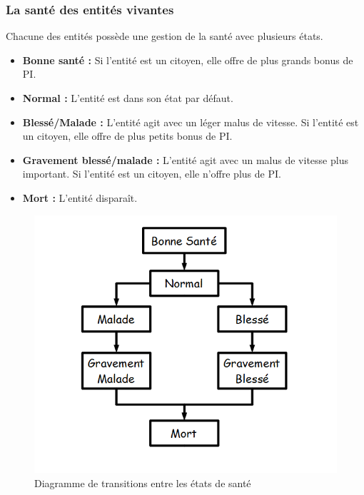 \documentclass[a4paper]{article}
\newcommand{\alinea}{\hspace*{0.5cm}}
\begin{document}
		  \subsubsection{La santé des entités vivantes}
			\alinea Chacune des entités possède une gestion de la santé avec plusieurs états.
			\begin{itemize} \small
			  \item \textbf{Bonne santé :} Si l'entité est un citoyen, elle offre de plus grands bonus de PI.
			  \item \textbf{Normal :} L'entité est dans son état par défaut.
			  \item \textbf{Blessé/Malade :} L'entité agit avec un léger malus de vitesse. Si l'entité est un citoyen, elle offre de plus petits bonus de PI.
			  \item \textbf{Gravement blessé/malade :} L'entité agit avec un malus de vitesse plus important. Si l'entité est un citoyen, elle n'offre plus de PI.
			  \item \textbf{Mort :} L'entité disparaît.
			\end{itemize} \normalsize
			\begin{figure}
			  \begin{center}
				\includegraphics[scale=0.5]{img/DiagrammeTransitionSante.png} 
			  \end{center}
			  \label{DiagSante}
			  \caption{Diagramme de transitions entre les états de santé}
			\end{figure}
	
\end{document}
